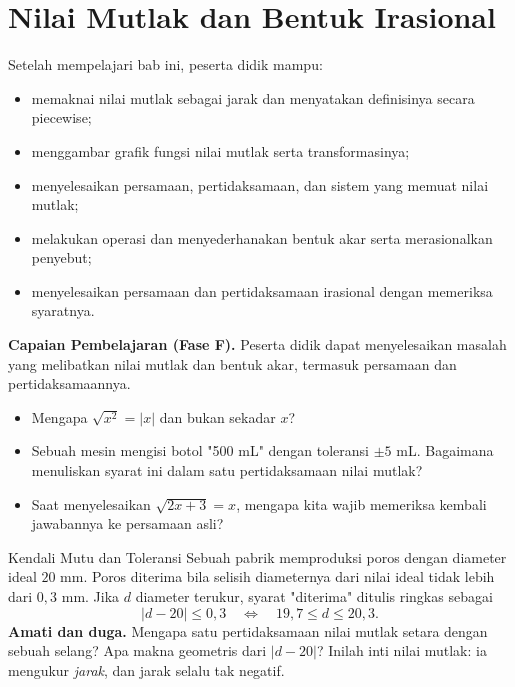 \documentclass[11pt,a4paper]{report}
\theoremstyle{gaya}
\begin{document}
\chapter{Nilai Mutlak dan Bentuk Irasional}
\begin{tujuan}
Setelah mempelajari bab ini, peserta didik mampu:
\begin{itemize}[leftmargin=*,topsep=2pt]
  \item memaknai nilai mutlak sebagai jarak dan menyatakan definisinya secara piecewise;
  \item menggambar grafik fungsi nilai mutlak serta transformasinya;
  \item menyelesaikan persamaan, pertidaksamaan, dan sistem yang memuat nilai mutlak;
  \item melakukan operasi dan menyederhanakan bentuk akar serta merasionalkan penyebut;
  \item menyelesaikan persamaan dan pertidaksamaan irasional dengan memeriksa syaratnya.
\end{itemize}
\textbf{Capaian Pembelajaran (Fase F).} Peserta didik dapat menyelesaikan masalah yang melibatkan nilai mutlak dan bentuk akar, termasuk persamaan dan pertidaksamaannya.
\end{tujuan}

\begin{pemantik}
\begin{itemize}[leftmargin=*,topsep=2pt]
  \item Mengapa $\sqrt{x^2}=|x|$ dan bukan sekadar $x$?
  \item Sebuah mesin mengisi botol "500 mL" dengan toleransi $\pm5$ mL. Bagaimana menuliskan syarat ini dalam satu pertidaksamaan nilai mutlak?
  \item Saat menyelesaikan $\sqrt{2x+3}=x$, mengapa kita wajib memeriksa kembali jawabannya ke persamaan asli?
\end{itemize}
\end{pemantik}

\begin{studikasus}{Kendali Mutu dan Toleransi}
Sebuah pabrik memproduksi poros dengan diameter ideal $20$ mm. Poros diterima bila selisih diameternya dari nilai ideal tidak lebih dari $0{,}3$ mm. Jika $d$ diameter terukur, syarat "diterima" ditulis ringkas sebagai
\[
|d-20|\le 0{,}3 \quad\Longleftrightarrow\quad 19{,}7\le d\le 20{,}3 .
\]
\textbf{Amati dan duga.} Mengapa satu pertidaksamaan nilai mutlak setara dengan sebuah selang? Apa makna geometris dari $|d-20|$? Inilah inti nilai mutlak: ia mengukur \emph{jarak}, dan jarak selalu tak negatif.
\end{studikasus}
\end{document}
